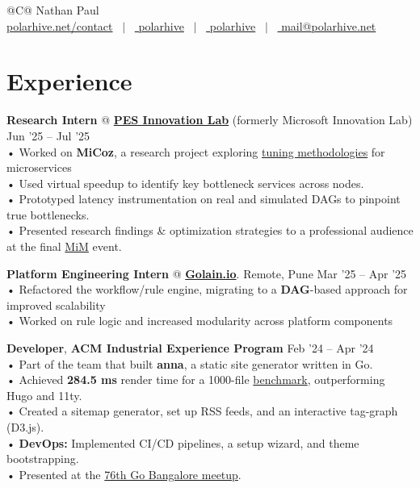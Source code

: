 \documentclass[a4,10pt]{article}
\begin{document}
\begin{tabularx}{\linewidth}{@{}C@{}}
\Huge{Nathan Paul} \\[10pt]
\href{https://polarhive.net}{ polarhive.net/contact} \ $|$ \
\href{https://github.com/polarhive}{ polarhive} \ $|$ \
\href{https://linkedin.com/in/polarhive}{ polarhive} \ $|$ \
\href{https://polarhive.net/email}{ mail@polarhive.net}
\end{tabularx}

\section{Experience}

\textbf{Research Intern} @ \textbf{\href{https://theinnovationlab.in/projects?project=MiCoz}{PES Innovation Lab}} (formerly Microsoft Innovation Lab) \hfill Jun '25 – Jul '25 \\
• Worked on \textbf{MiCoz}, a research project exploring \href{https://dl.acm.org/doi/10.1145/2815400.2815409}{tuning methodologies} for microservices\\
• Used virtual speedup to identify key bottleneck services across nodes. \\
• Prototyped latency instrumentation on real and simulated DAGs to pinpoint true bottlenecks. \\
• Presented research findings \& optimization strategies to a professional audience at the final \href{https://www.linkedin.com/posts/polarhive_research-internship-theinnovationlab-activity-7366541471715368961-em_T}{MiM} event.

\textbf{Platform Engineering Intern} @ \textbf{\href{https://golain.io}{Golain.io}}. Remote, Pune \hfill Mar '25 – Apr '25 \\
• Refactored the workflow/rule engine, migrating to a \textbf{DAG}-based approach for improved scalability \\
• Worked on rule logic and increased modularity across platform components

\textbf{Developer}, \textbf{ACM Industrial Experience Program} \hfill Feb '24 – Apr '24 \\
• Part of the team that built \textbf{anna}, a static site generator written in Go. \\
• Achieved \textbf{284.5 ms} render time for a 1000-file \href{https://github.com/anna-ssg/anna/actions}{benchmark}, outperforming Hugo and 11ty. \\
• Created a sitemap generator, set up RSS feeds, and an interactive tag-graph (D3.js). \\
• \textbf{DevOps:} Implemented CI/CD pipelines, a setup wizard, and theme bootstrapping. \\
• Presented at the \href{https://www.meetup.com/golang-bangalore/events/301697429/}{76th Go Bangalore meetup}.
\end{document}
